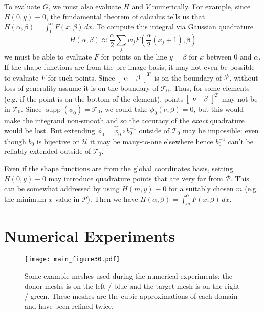 \documentclass[oneside, reqno]{amsart}
\theoremstyle{definition}
\newcommand{\utri}{\mathcal{U}}
\begin{document}
To evaluate \(G\), we must also evaluate \(H\) and \(V\) numerically.
For example, since \(H(0, y) \equiv 0\),
the fundamental theorem of calculus tells us that
\(H\left(\alpha, \beta\right) = \int_0^{\alpha} F\left(x, \beta\right) \, dx\).
To compute this integral via Gaussian quadrature
\begin{equation}
H\left(\alpha, \beta\right) \approx \frac{\alpha}{2} \sum_j w_j
  F\left(\frac{\alpha}{2} (x_j + 1), \beta\right)
\end{equation}
we must be able to evaluate \(F\) for
points on the line \(y = \beta\) for \(x\) between \(0\) and \(\alpha\). If
the shape functions are from the pre-image basis, it may not even be possible
to evaluate \(F\) for such points. Since \(\left[\begin{array}{c c} \alpha &
\beta \end{array}\right]^T\) is on the boundary of \(\mathcal{P}\), without
loss of generality
assume it is on the boundary of \(\mathcal{T}_0\). Thus, for some elements
(e.g. if the point is on the bottom of the element), points
\(\left[\begin{array}{c c} \nu & \beta \end{array}\right]^T\) may not be
in \(\mathcal{T}_0\). Since \(\operatorname{supp}(\phi_0) = \mathcal{T}_0\),
we could take \(\phi_0(\nu, \beta) = 0\), but this would make the integrand
non-smooth and so the accuracy of the \emph{exact} quadrature would be
lost. But extending \(\phi_0 = \widehat{\phi}_0 \circ b_0^{-1}\) outside
of \(\mathcal{T}_0\) may be impossible: even though \(b_0\) is bijective on
\(\utri\) it may be many-to-one elsewhere hence \(b_0^{-1}\) can't be
reliably extended outside of \(\mathcal{T}_0\).

Even if the shape functions are from the global coordinates basis,
setting \(H(0, y) \equiv 0\) may introduce quadrature points that
are very far from \(\mathcal{P}\). This can be somewhat addressed by using
\(H(m, y) \equiv 0\) for a suitably chosen \(m\) (e.g. the minimum
\(x\)-value in \(\mathcal{P}\)). Then we have
\(H\left(\alpha, \beta\right) = \int_m^{\alpha} F\left(x, \beta\right) \, dx\).

\section{Numerical Experiments}

\begin{figure}
  \texttt{[image: main\_figure30.pdf]}
  \centering
  \captionsetup{width=.75\linewidth}
  \caption{Some example meshes used during the numerical
    experiments; the donor meshs is on the left / blue and the target
    mesh is on the right / green. These meshes are the cubic approximations
    of each domain and have been refined twice.}
  \label{fig:meshes-used-refined}
\end{figure}
\end{document}
